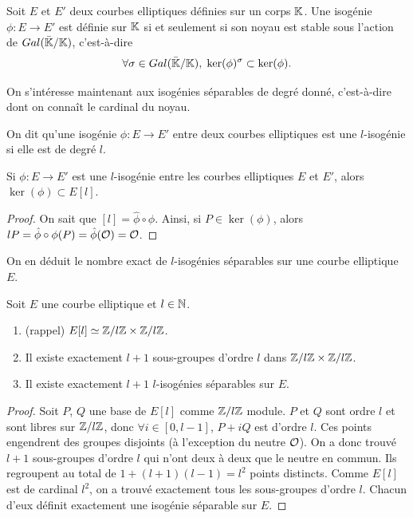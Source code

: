 \begin{Prop}
	
	Soit $E$ et $E'$ deux courbes elliptiques définies sur un corps $\mathbb{K}$. Une isogénie $\phi : E\rightarrow E'$ est définie sur $\mathbb{K}$ si et seulement si son noyau est stable sous l'action de $Gal(\bar{\mathbb{K}}/\mathbb{K})$, c'est-à-dire
	\begin{equation*}
		\forall\sigma\in Gal(\bar{\mathbb{K}}/\mathbb{K}),\; \ker(\phi)^{\sigma} \subset \ker(\phi).
	\end{equation*}
\end{Prop}

On s'intéresse maintenant aux isogénies séparables de degré donné, c'est-à-dire dont on connaît le cardinal du noyau.

\begin{Def}
	On dit qu'une isogénie $\phi : E\rightarrow E'$ entre deux courbes elliptiques est une $l$-isogénie si elle est de degré $l$. 
\end{Def}

\begin{Prop}
	Si $\phi : E\rightarrow E'$ est une $l$-isogénie entre les courbes elliptiques $E$ et $E'$, alors $\ker(\phi)\subset E\left[ l\right] $.
\end{Prop}

\begin{proof}
	On sait que $\left[ l\right] = \hat{\phi}\circ\phi$. Ainsi, si $P\in \ker(\phi)$, alors $lP = \hat{\phi}\circ\phi(P) = \hat{\phi}(\mathcal{O}) = \mathcal{O} $.
\end{proof}

On en déduit le nombre exact de $l$-isogénies séparables sur une courbe elliptique $E$.

\begin{Prop}\label{NbDeLIsogenies}
	Soit $E$ une courbe elliptique et $l\in\mathbb{N}$.
	\begin{enumerate}
		\item(rappel) $E[l] \simeq \mathbb{Z}/l\mathbb{Z}\times\mathbb{Z}/l\mathbb{Z}$.
		\item Il existe exactement $l+1$ sous-groupes d'ordre $l$ dans $\mathbb{Z}/l\mathbb{Z}\times\mathbb{Z}/l\mathbb{Z}$.
		\item Il existe exactement $l+1$ $l$-isogénies séparables sur $E$.
	\end{enumerate}
\end{Prop}


\begin{proof}
	Soit $P$, $Q$ une base de $E\left[ l\right]$ comme $\mathbb{Z}/l\mathbb{Z}$ module. $P$ et $Q$ sont ordre $l$ et sont libres sur $\mathbb{Z}/l\mathbb{Z}$, donc $\forall i\in\left[ 0 , l - 1\right] $, $P + iQ$ est d'ordre $l$. Ces points engendrent des groupes disjoints (à l'exception du neutre $\mathcal{O}$). On a donc trouvé $l + 1$ sous-groupes d'ordre $l$ qui n'ont deux à deux que le neutre en commun. Ils regroupent au total de $1 + (l+1)(l - 1) = l^2$ points distincts. Comme $E[l]$ est de cardinal $l^2$, on a trouvé exactement tous les sous-groupes d'ordre $l$. Chacun d'eux définit exactement une isogénie séparable sur $E$.
\end{proof}





